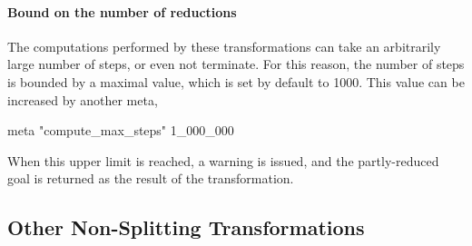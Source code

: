 \paragraph{Bound on the number of reductions}
The computations performed by these transformations can take an
arbitrarily large number of steps, or even not terminate. For this
reason, the number of steps is bounded by a maximal value, which is
set by default to 1000. This value can be increased by another meta,
\eg
\begin{whycode}
meta "compute_max_steps" 1_000_000
\end{whycode}
When this upper limit is reached, a warning is issued, and the
partly-reduced goal is returned as the result of the transformation.


\subsection{Other Non-Splitting Transformations}

